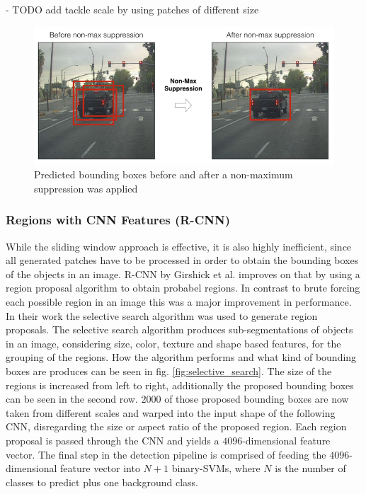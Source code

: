 - TODO add tackle scale by using patches of different size

\begin{figure}
\begin{center}
    \includegraphics[width=16cm]{imgs/nms_before_after.png}
    \caption{Predicted bounding boxes before and after a non-maximum suppression was applied \cite{nms_before_after}}
    \label{fig:nms_before_after}
\end{center}
\end{figure}


\subsubsection{Regions with CNN Features (R-CNN)}
While the sliding window approach is effective, it is also highly inefficient, since all generated patches have to be processed in order to obtain the bounding boxes of the objects in an image.
\ac{R-CNN} by Girshick et al. \cite{rcnn} improves on that by using a region proposal algorithm to obtain probabel regions.
In contrast to brute forcing each possible region in an image this was a major improvement in performance.
In their work the selective search algorithm \cite{selective_search} was used to generate region proposals.
The selective search algorithm produces sub-segmentations of objects in an image, considering size, color, texture and shape based features, for the grouping of the regions.
How the algorithm performs and what kind of bounding boxes are produces can be seen in fig. \ref{fig:selective_search}.
The size of the regions is increased from left to right, additionally the proposed bounding boxes can be seen in the second row.
$2000$ of those proposed bounding boxes are now taken from different scales and warped into the input shape of the following \ac{CNN}, disregarding the size or aspect ratio of the proposed region.
Each region proposal is passed through the \ac{CNN} and yields a $4096$-dimensional feature vector.
The final step in the detection pipeline is comprised of feeding the $4096$-dimensional feature vector into $N + 1$ binary-\ac{SVMs}, where $N$ is the number of classes to predict plus one background class.


